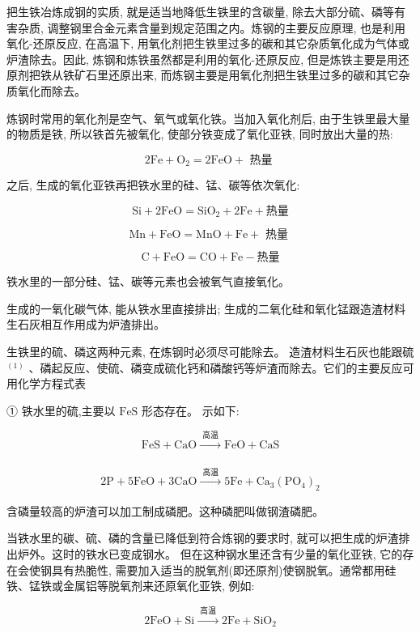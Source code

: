 \documentclass[10pt]{article}
\begin{document}
把生铁冶炼成钢的实质, 就是适当地降低生铁里的含碳量, 除去大部分硫、磷等有害杂质, 调整钢里合金元素含量到规定范围之内。炼钢的主要反应原理, 也是利用氧化-还原反应, 在高温下, 用氧化剂把生铁里过多的碳和其它杂质氧化成为气体或炉渣除去。因此, 炼钢和炼铁虽然都是利用的氧化-还原反应, 但是炼铁主要是用还原剂把铁从铁矿石里还原出来, 而炼钢主要是用氧化剂把生铁里过多的碳和其它杂质氧化而除去。

炼钢时常用的氧化剂是空气、氧气或氧化铁。当加入氧化剂后, 由于生铁里最大量的物质是铁, 所以铁首先被氧化, 使部分铁变成了氧化亚铁, 同时放出大量的热:

\[
2\mathrm{{Fe}} + {\mathrm{O}}_{2} = 2\mathrm{{FeO}} + \text{ 热量 }
\]

之后, 生成的氧化亚铁再把铁水里的硅、锰、碳等依次氧化:

\[
\mathrm{{Si}} + 2\mathrm{{FeO}} = {\mathrm{{SiO}}}_{2} + 2\mathrm{{Fe}} + \text{热量}
\]

\[
\mathrm{{Mn}} + \mathrm{{FeO}} = \mathrm{{MnO}} + \mathrm{{Fe}} + \text{ 热量 }
\]

\[
\mathrm{C} + \mathrm{{FeO}} = \mathrm{{CO}} + \mathrm{{Fe}} - \text{热量}
\]

铁水里的一部分硅、锰、碳等元素也会被氧气直接氧化。

生成的一氧化碳气体, 能从铁水里直接排出; 生成的二氧化硅和氧化锰跟造渣材料生石灰相互作用成为炉渣排出。

生铁里的硫、磷这两种元素, 在炼钢时必须尽可能除去。 造渣材料生石灰也能跟硫 \({}^{\left( 1\right) }\) 、磷起反应、使硫、磷变成硫化钙和磷酸钙等炉渣而除去。它们的主要反应可用化学方程式表

① 铁水里的硫,主要以 \(\mathrm{{FeS}}\) 形态存在。 示如下:

\[
\mathrm{{FeS}} + \mathrm{{CaO}}\xrightarrow[]{\text{ 高温 }}\mathrm{{FeO}} + \mathrm{{CaS}}
\]

\[
2\mathrm{P} + 5\mathrm{{FeO}} + 3\mathrm{{CaO}}\xrightarrow[]{\text{ 高温 }}5\mathrm{{Fe}} + {\mathrm{{Ca}}}_{3}{\left( {\mathrm{{PO}}}_{4}\right) }_{2}
\]

含磷量较高的炉渣可以加工制成磷肥。这种磷肥叫做钢渣磷肥。

当铁水里的碳、硫、磷的含量已降低到符合炼钢的要求时, 就可以把生成的炉渣排出炉外。这时的铁水已变成钢水。 但在这种钢水里还含有少量的氧化亚铁, 它的存在会使钢具有热脆性, 需要加入适当的脱氧剂(即还原剂)使钢脱氧。通常都用硅铁、锰铁或金属铝等脱氧剂来还原氧化亚铁, 例如:

\[
2\mathrm{{FeO}} + \mathrm{{Si}}\xrightarrow[]{\text{ 高温 }}2\mathrm{{Fe}} + {\mathrm{{SiO}}}_{2}
\]
\end{document}
